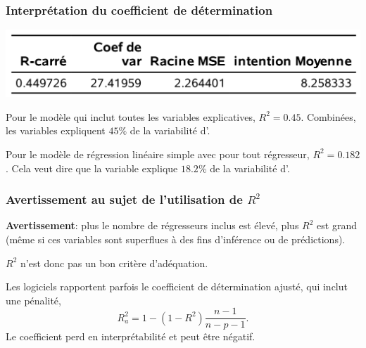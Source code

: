 \documentclass[xcolor={dvipsnames}]{beamer}
\begin{document}
 \begin{frame}
\frametitle{Interprétation du coefficient de détermination}
\begin{center}
\includegraphics[width=0.6\linewidth]{img/c2/diapos3-e13}
\end{center}
\bi
\item Pour le modèle qui inclut toutes les variables explicatives,
$R^2=0.45$. Combinées, les variables expliquent $45\%$ de la variabilité d'.
\item Pour le modèle de régression linéaire simple avec  pour tout régresseur, 
$R^2 = 0.182$. Cela veut dire que la variable  explique  $18.2$\% de la variabilité d'.
\ei
\end{frame}

 \begin{frame}
 \frametitle{Avertissement au sujet de l'utilisation de $R^2$}
 \bi 
 \item 
 \textbf{Avertissement}: plus le nombre de régresseurs inclus est élevé, plus $R^2$ est grand (même si ces variables sont superflues à des fins d'inférence ou de prédictions).
  \item $R^2$ n'est donc pas un bon critère d'adéquation.
  \item Les logiciels rapportent parfois le coefficient de détermination ajusté, qui inclut une pénalité,  \[R^2_a=1-(1-R^{2})\frac{n-1}{n-p-1}. \]  
  Le coefficient perd en interprétabilité et peut être négatif.
  \ei 
  \end{frame}
  
  
\end{document}

